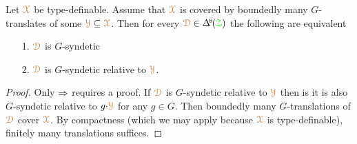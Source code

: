 \begin{proposition}\label{prop_HgenGgen}
  Let ${\color{brown}\EuScript X}$ be type-definable.
  Assume that ${\color{brown}\EuScript X}$ is covered by boundedly many $G$-translates of some ${\color{brown}\EuScript Y}\subseteq{\color{brown}\EuScript X}$.
  Then for every $\mrD\in\BDelta(\grZ)$ the following are equivalent
  \begin{itemize}
    \item [1.] ${\color{brown}\EuScript D}$ is $G$-syndetic
    \item [2.] ${\color{brown}\EuScript D}$ is $G$-syndetic relative to ${\color{brown}\EuScript Y}$.
  \end{itemize}
\end{proposition}

\begin{proof}
  Only $\Rightarrow$ requires a proof.
  If ${\color{brown}\EuScript D}$ is $G$-syndetic relative to ${\color{brown}\EuScript Y}$ then is it is also $G$-syndetic relative to $g{\cdot}{\color{brown}\EuScript Y}$ for any $g\in G$.
  Then boundedly many $G$-translations of ${\color{brown}\EuScript D}$ cover ${\color{brown}\EuScript X}$.
  By compactness (which we may apply because ${\color{brown}\EuScript X}$ is type-definable), finitely many translations suffices.
\end{proof}



  
  

